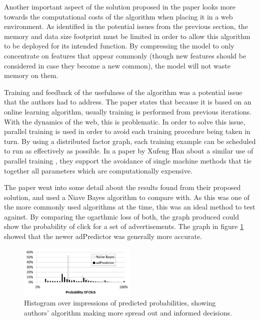 \documentclass[journal]{IEEEtran}
\begin{document}
Another important aspect of the solution proposed in the paper looks more towards the computational costs of the algorithm when placing it in a web environment. As identified in the potential issues from the previous section, the memory and data size footprint must be limited in order to allow this algorithm to be deployed for its intended function. By compressing the model to only concentrate on features that appear commonly (though new features should be considered in case they become a new common), the model will not waste memory on them. \par
Training and feedback of the usefulness of the algorithm was a potential issue that the authors had to address. The paper states that because it is based on an online learning algorithm, usually training is performed from previous iterations. With the dynamics of the web, this is problematic. In order to solve this issue, parallel training is used in order to avoid each training procedure being taken in turn. By using a distributed factor graph, each training example can be scheduled to run as effectively as possible. In a paper by Xufeng Han about a similar use of parallel training \cite{training}, they support the avoidance of single machine methods that tie together all parameters which are computationally expensive. \par
The paper went into some detail about the results found from their proposed solution, and used a Niave Bayes algorithm to compare with. As this was one of the more commonly used algorithms at the time, this was an ideal method to test against. By comparing the ogarthmic loss of both, the graph produced could show the probability of click for a set of advertisements. The graph in figure \ref{fig:results} showed that the newer adPredictor was generally more accurate.
\begin{figure}[!ht]
  \caption{Histogram over impressions of predicted probabilities, showing authors' algorithm making more spread out and informed decisions.}
  \centering
  \label{fig:results}
    \includegraphics[width=0.5\textwidth]{results}
\end{figure}
\end{document}
